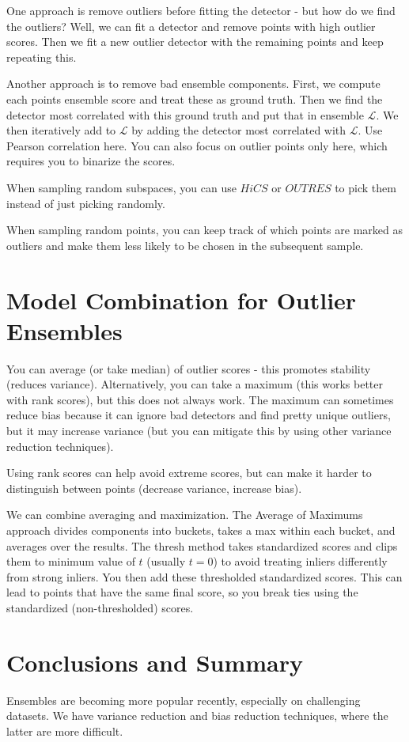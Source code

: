 \documentclass[a4paper]{article}
\begin{document}
One approach is remove outliers before fitting
the detector - but how do we find the outliers? Well, we can fit a detector
and remove points with high outlier scores. Then we fit a new outlier
detector with the remaining points and keep repeating this.

Another approach is to remove bad ensemble components. First, we compute
each points ensemble score and treat these as ground truth. Then we
find the detector most correlated with this ground truth and put that
in ensemble $\mathcal{L}$. We then iteratively add to $\mathcal{L}$ by adding
the detector most correlated with $\mathcal{L}$. Use Pearson correlation here.
You can also focus on outlier points only here, which requires you to
binarize the scores.

When sampling random subspaces, you can use $HiCS$ or $OUTRES$ to pick
them instead of just picking randomly.

When sampling random points, you can keep track of which points are marked
as outliers and make them less likely to be chosen in the subsequent sample.

\section{Model Combination for Outlier Ensembles}
You can average (or take median) of outlier scores - this promotes stability
(reduces variance). Alternatively, you can take a maximum (this works
better with rank scores), but this does not always work. The maximum
can sometimes reduce bias because it can ignore bad detectors and find
pretty unique outliers, but it may increase variance (but you can
mitigate this by using other variance reduction techniques).

Using rank scores can help avoid extreme scores, but can make it harder
to distinguish between points (decrease variance, increase bias).

We can combine averaging and maximization. The Average of Maximums approach
divides components into buckets, takes a max within each bucket, and
averages over the results. The thresh method takes standardized scores
and clips them to minimum value of $t$ (usually $t = 0$) to avoid treating
inliers differently from strong inliers. You then add these thresholded
standardized scores. This can lead to points that have the same final score,
so you break ties using the standardized (non-thresholded) scores.

\section{Conclusions and Summary}
Ensembles are becoming more popular recently, especially on challenging
datasets. We have variance reduction and bias reduction techniques, where
the latter are more difficult.
\end{document}
